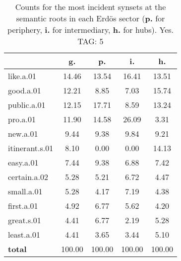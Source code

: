 \begin{table}[h!]
\begin{center}
\begin{tabular}{| l || c | c | c | c |}\hline
 & {\bf g.} & {\bf p.} & {\bf i.} & {\bf h.} \\\hline\hline
like.a.01 & 14.46  & 13.54  & 16.41  & 13.51 \\\hline
good.a.01 & 12.21  & 8.85  & 7.03  & 15.74 \\\hline
public.a.01 & 12.15  & 17.71  & 8.59  & 13.24 \\\hline
pro.a.01 & 11.90  & 14.58  & 26.09  & 3.31 \\\hline
new.a.01 & 9.44  & 9.38  & 9.84  & 9.21 \\\hline
itinerant.s.01 & 8.10  & 0.00  & 0.00  & 14.13 \\\hline
easy.a.01 & 7.44  & 9.38  & 6.88  & 7.42 \\\hline
certain.a.02 & 5.28  & 5.21  & 6.72  & 4.47 \\\hline
small.a.01 & 5.28  & 4.17  & 7.19  & 4.38 \\\hline
first.a.01 & 4.92  & 6.77  & 5.62  & 4.20 \\\hline
great.s.01 & 4.41  & 6.77  & 2.19  & 5.28 \\\hline
least.a.01 & 4.41  & 3.65  & 3.44  & 5.10 \\\hline\hline
{{\bf total}} & 100.00  & 100.00  & 100.00  & 100.00 \\\hline
\end{tabular}
\caption{Counts for the most incident synsets at the semantic roots in each Erd\"os sector ({\bf p.} for periphery, {\bf i.} for intermediary, {\bf h.} for hubs). Yes. TAG: 5}
\end{center}
\end{table}